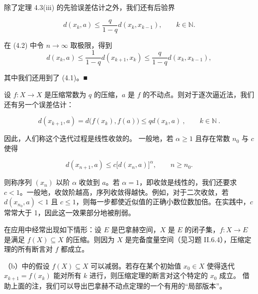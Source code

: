 \begin{remark}

\begin{items}
\item

除了定理 4.3(iii) 的先验误差估计之外，我们还有后验界

\[
d(x_{k},a)\leq\frac{q}{1-q}d(x_{k},x_{k-1}),\qquad k\in\mathbb{N}.
\]

\proofhead
在 (4.2) 中令 $ n \to \infty $ 取极限，得到
\[
d(x_{k},a)\leq\frac{1}{1-q}d(x_{k+1},x_{k})\leq\frac{q}{1-q}d(x_{k},x_{k-1}),
\]

其中我们还用到了 (4.1)。■

\item

设 $f: X \to X$ 是压缩常数为 $q$ 的压缩，$a$ 是 $f$ 的不动点。则对于逐次逼近法，我们还有另一个误差估计：

\[
d(x_{k+1},a)=d\bigl(f(x_{k}),f(a)\bigr)\leq q d(x_{k},a)~,\qquad k\in\mathbb{N}~.
\]

因此，人们称这个迭代过程是线性收敛的。
一般地，若 $ \alpha \geq 1 $ 且存在常数 $ n_0 $ 与 $ c $ 使得

\[
d(x_{n+1},a)\leq c\big[d(x_{n},a)\big]^{\alpha},\qquad n\geq n_{0}.
\]

则称序列 $ (x_n) $ 以阶 $ \alpha $ 收敛到 $ a $。若 $\alpha=1$，即收敛是线性的，我们还要求 $c<1$。一般地，收敛阶越高，序列收敛得越快。例如，对于二次收敛，若 $d(x_{n_0},a)<1$ 且 $c\leq1$，则每一步都使近似值的正确小数位数加倍。在实践中，$c$ 常常大于 1，因此这一效果部分地被削弱。

\item

在应用中经常出现如下情形：设 $E$ 是巴拿赫空间，$X$ 是 $E$ 的闭子集，$f: X \to E$ 是满足 $f(X) \subseteq X$ 的压缩。则因为 $X$ 是完备度量空间（见习题 II.6.4），压缩定理的所有断言对 $f$ 都成立。

\item

（b）中的假设 $f(X) \subseteq X$ 可以减弱。若存在某个初始值 $x_0 \in X$ 使得迭代 $x_{k+1} = f(x_k)$ 能对所有 $k$ 进行，则压缩定理的断言对这个特定的 $x_0$ 成立。
借助上面的注，我们可以导出巴拿赫不动点定理的一个有用的“局部版本”。

\end{items}

\end{remark}

